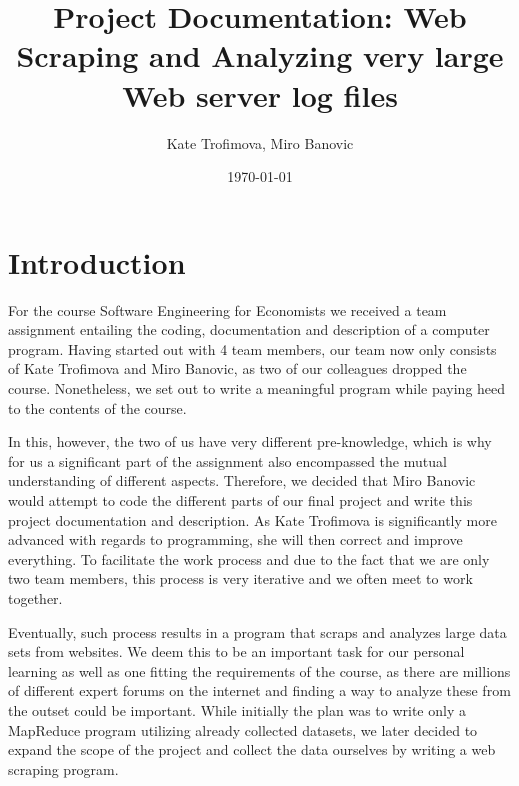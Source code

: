 \documentclass[a4paper, 12pt]{article}
\begin{document}
 
\author{Kate Trofimova,  Miro Banovic}
\title{Project Documentation: Web Scraping and Analyzing very large Web server log files}
\date{\today}

\maketitle
\titlepage
\cleardoublepage

\thispagestyle{plain}
\setcounter{page}{2}
\tableofcontents
\cleardoublepage

\listoffigures
\cleardoublepage


\section{Introduction}
For the course Software Engineering for Economists we received a team assignment entailing the coding, documentation and description of a computer program. Having started out with 4 team members, our team now only consists of Kate Trofimova and Miro Banovic, as two of our colleagues dropped the course. Nonetheless, we set out to write a meaningful program while paying heed to the contents of the course. 

In this, however, the two of us have very different pre-knowledge, which is why for us a significant part of the assignment also encompassed the mutual understanding of different aspects. Therefore, we decided that Miro Banovic would attempt to code the different parts of our final project and write this project documentation and description. As Kate Trofimova is significantly more advanced with regards to programming, she will then correct and improve everything. To facilitate the work process and due to the fact that we are only two team members, this process is very iterative and we often meet to work together. 

Eventually, such process results in a program that scraps and analyzes large data sets from websites. We deem this to be an important task for our personal learning as well as one fitting the requirements of the course, as there are millions of different expert forums on the internet and finding a way to analyze these from the outset could be important. While initially the plan was to write only a MapReduce program utilizing already collected datasets, we later decided to expand the scope of the project and collect the data ourselves by writing a web scraping program. 
\end{document}
